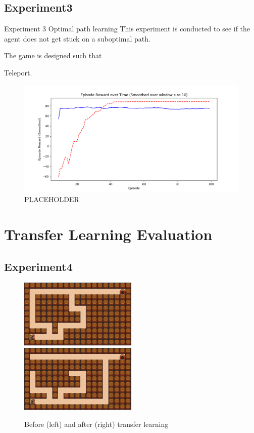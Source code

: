 \subsection{Experiment3}
Experiment 3 Optimal path learning
This experiment is conducted to see if the agent does not get stuck on a suboptimal path. 

The game is designed such that 

Teleport. 

\begin{figure}[!htb]
\centering
\includegraphics[width=1.0\textwidth]{./figures/placeholder}
\caption{PLACEHOLDER}
\label{proposed_architecture}
\end{figure}
    

\section{Transfer Learning Evaluation}
\label{transfer_learning}

\subsection{Experiment4}

\begin{figure}[!htb]
\centerline{
\includegraphics[width=0.5\textwidth]{./figures/experiment4_before}
\includegraphics[width=0.5\textwidth]{./figures/experiment4_after}
}
\caption{Before (left) and after (right) transfer learning}
\label{experiment4}
\end{figure}    

